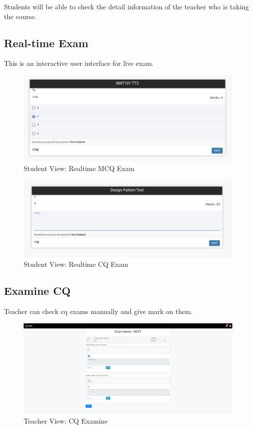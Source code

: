 \documentclass[10pt]{article}
\begin{document}
Students will be able to check the detail information of the teacher who is taking the course.


\subsection{Real-time Exam}

This is an interactive user interface for live exam.

\begin{figure}[H]
  \centering
  \centerline{\includegraphics[width=\textwidth]{studnt/live-exam-mcq.png}}
  \caption{Student View: Realtime MCQ Exam}
  \label{fig}
\end{figure}

\begin{figure}[H]
  \centering
  \centerline{\includegraphics[width=\textwidth]{studnt/live-exam-cq.png}}
  \caption{Student View: Realtime CQ Exam}
  \label{fig}
\end{figure}



\subsection{Examine CQ}

Teacher can check cq exams manually and give mark on them.

\begin{figure}[H]
  \centering
  \centerline{\includegraphics[width=\textwidth]{teacher/examine-cq2.png}}
  \caption{Teacher View: CQ Examine}
  \label{fig}
\end{figure}
\end{document}
